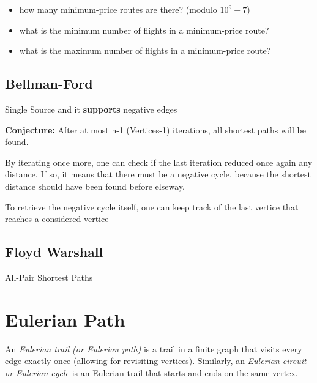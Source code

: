 		\begin{itemize}
			\item how many minimum-price routes are there? (modulo $10^9+7$)
			\item what is the minimum number of flights in a minimum-price route?
			\item what is the maximum number of flights in a minimum-price route?
		\end{itemize}


	\subsection{Bellman-Ford}

		Single Source and it \textbf{supports} negative edges

		\textbf{Conjecture:} After at most n-1 (Vertices-1) iterations, all shortest paths will be found.
		

		By iterating once more, one can check if the last iteration reduced once again any distance. If so, it means that
		there must be a negative cycle, because the shortest distance should have been found before elseway.
		
		To retrieve the negative cycle itself, one can keep track of the last vertice that reaches a considered vertice

	
	\vspace{7pts}

	\subsection{Floyd Warshall}

	All-Pair Shortest Paths


\section{Eulerian Path}

	An \textit{Eulerian trail (or Eulerian path)} is a trail in a finite graph that visits every edge exactly once 
	(allowing for revisiting vertices). Similarly, an \textit{Eulerian circuit or Eulerian cycle} is an Eulerian trail 
	that starts and ends on the same vertex. 


